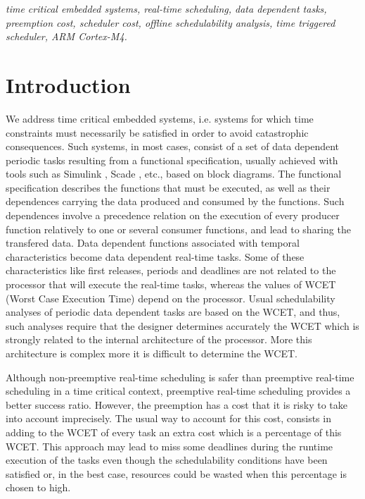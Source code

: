 \documentclass[conference,compsocconf]{IEEEtran}
\begin{document}
\begin{IEEEkeywords}
  \textit{time critical embedded systems, real-time scheduling, data dependent
    tasks, preemption cost, scheduler cost, offline schedulability analysis,
    time triggered scheduler, ARM Cortex-M4.}
\end{IEEEkeywords}

\section{Introduction}

We address time critical embedded systems, i.e. systems for which time
constraints must necessarily be satisfied in order to avoid catastrophic
consequences. Such systems, in most cases, consist of a set of data dependent
periodic tasks resulting from a functional specification, usually achieved with
tools such as Simulink \cite{simulink}, Scade \cite{scade}, etc., based on
block diagrams. The functional specification describes the functions that must
be executed, as well as their dependences carrying the data produced and
consumed by the functions. Such dependences involve a precedence relation on
the execution of every producer function relatively to one or several consumer
functions, and lead to sharing the transfered data. Data dependent functions
associated with temporal characteristics become data dependent real-time
tasks. Some of these characteristics like first releases, periods and deadlines
are not related to the processor that will execute the real-time tasks, whereas
the values of WCET (Worst Case Execution Time) depend on the processor.  Usual
schedulability analyses of periodic data dependent tasks are based on the WCET,
and thus, such analyses require that the designer determines accurately the
WCET which is strongly related to the internal architecture of the
processor. More this architecture is complex more it is difficult to determine
the WCET.

Although non-preemptive real-time scheduling is safer than preemptive real-time
scheduling in a time critical context, preemptive real-time scheduling provides
a better success ratio. However, the preemption has a cost that it is risky to
take into account imprecisely. The usual way to account for this cost, consists
in adding to the WCET of every task an extra cost which is a percentage of this
WCET. This approach may lead to miss some deadlines during the runtime
execution of the tasks even though the schedulability conditions have been
satisfied or, in the best case, resources could be wasted when this percentage
is chosen to high.
\end{document}
